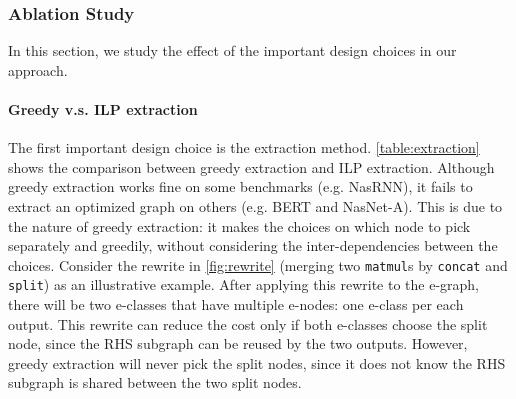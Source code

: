 


\subsubsection{Ablation Study}
\label{sec:ablation}

In this section, we study the effect of the important design choices in our approach.

\paragraph{Greedy v.s. ILP extraction}

The first important design choice is the extraction method.
\autoref{table:extraction} shows the comparison between greedy extraction and ILP extraction.
Although greedy extraction works fine on some benchmarks (e.g. NasRNN), it fails to extract an optimized graph on others (e.g. BERT and NasNet-A).
This is due to the nature of greedy extraction: it makes the choices on which node to pick separately and greedily, without considering the inter-dependencies between the choices.
Consider the rewrite in \autoref{fig:rewrite} (merging two \texttt{matmul}s by \texttt{concat} and \texttt{split}) as an illustrative example.
After applying this rewrite to the e-graph, there will be two e-classes that have multiple e-nodes: one e-class per each output.
This rewrite can reduce the cost only if both e-classes choose the split node, since the RHS subgraph can be reused by the two outputs.
However, greedy extraction will never pick the split nodes, since it does not know the RHS subgraph is shared between the two split nodes.

